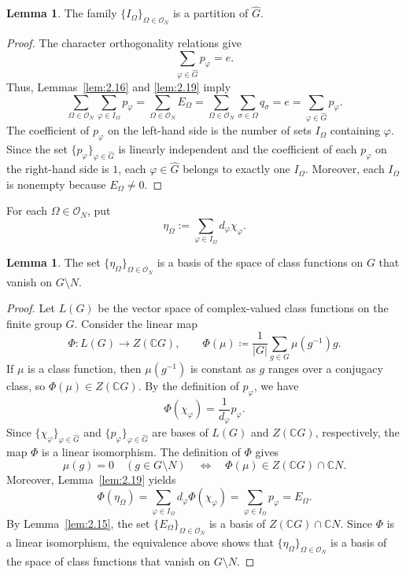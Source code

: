 \documentclass[12pt,a4paper]{article}
\theoremstyle{definition}
\newtheorem{lem}[definition]{Lemma}
\numberwithin{definition}{section}
\begin{document}
\begin{lem}\label{lem:2.20}
The family $\{I_\Omega \}_{\Omega\in\mathcal{O}_N}$ is a partition of $\widehat G$.
\end{lem}
\begin{proof}
The character orthogonality relations give
\[
\sum_{\varphi \in \widehat{G}} p_{\varphi} = e.
\]
Thus, Lemmas~\ref{lem:2.16} and \ref{lem:2.19} imply
\[
\sum_{\Omega \in \mathcal O_{N}} \sum_{\varphi \in I_{\Omega}} p_{\varphi}
=
\sum_{\Omega \in \mathcal O_{N}} E_{\Omega}
=
\sum_{\Omega \in \mathcal O_{N}} \sum_{\sigma \in \Omega} q_{\sigma}
=
e
=
\sum_{\varphi \in \widehat{G}} p_{\varphi}.
\]
The coefficient of $p_\varphi$ on the left-hand side is the number of sets $I_\Omega$ containing $\varphi$.
Since the set $\{p_\varphi\}_{\varphi\in\widehat G}$ is linearly independent
and the coefficient of each $p_\varphi$ on the right-hand side is $1$,
each $\varphi\in\widehat G$ belongs to exactly one $I_\Omega$.
Moreover, each $I_\Omega$ is nonempty because $E_\Omega\ne 0$.
\end{proof}

For each $\Omega\in\mathcal{O}_N$, put
\[
\eta_\Omega:=\sum_{\varphi\in I_\Omega}d_\varphi\chi_\varphi.
\]

\begin{lem}\label{lem:2.21}
The set $\{\eta_\Omega\}_{\Omega\in\mathcal{O}_N}$ is a basis of the space of class functions on $G$ that vanish on $G \setminus N$.
\end{lem}
\begin{proof}
Let $L(G)$ be the vector space of complex-valued class functions on the finite group $G$.
Consider the linear map
\[
\Phi\colon L(G)\to Z(\mathbb{C}G), \qquad
\Phi(\mu) \coloneqq \frac{1}{|G|}\sum_{g\in G}\mu(g^{-1})g.
\]
If $\mu$ is a class function, then $\mu(g^{-1})$ is constant as $g$ ranges over a conjugacy class,
so $\Phi(\mu) \in Z(\mathbb{C}G)$.
By the definition of $p_\varphi$, we have
\[
\Phi(\chi_\varphi) = \frac{1}{d_\varphi}p_\varphi.
\]
Since $\{\chi_\varphi\}_{\varphi\in\widehat G}$ and $\{p_\varphi\}_{\varphi\in\widehat G}$
are bases of $L(G)$ and $Z(\mathbb{C}G)$, respectively, the map $\Phi$ is a linear isomorphism.
The definition of $\Phi$ gives
\[
\mu(g)=0\quad(g\in G\setminus N)
\quad\Longleftrightarrow\quad
\Phi(\mu)\in Z(\mathbb{C}G)\cap\mathbb{C}N.
\]
Moreover, Lemma~\ref{lem:2.19} yields
\[
\Phi(\eta_\Omega)
=\sum_{\varphi\in I_\Omega}d_\varphi\Phi(\chi_\varphi)
=\sum_{\varphi\in I_\Omega}p_\varphi
=E_\Omega.
\]
By Lemma~\ref{lem:2.15}, the set $\{E_\Omega\}_{\Omega\in\mathcal{O}_N}$
is a basis of $Z(\mathbb{C}G)\cap\mathbb{C}N$.
Since $\Phi$ is a linear isomorphism, the equivalence above shows that
$\{\eta_\Omega\}_{\Omega\in\mathcal{O}_N}$ is a basis of the space of class functions that vanish on $G\setminus N$.
\end{proof}
\end{document}
